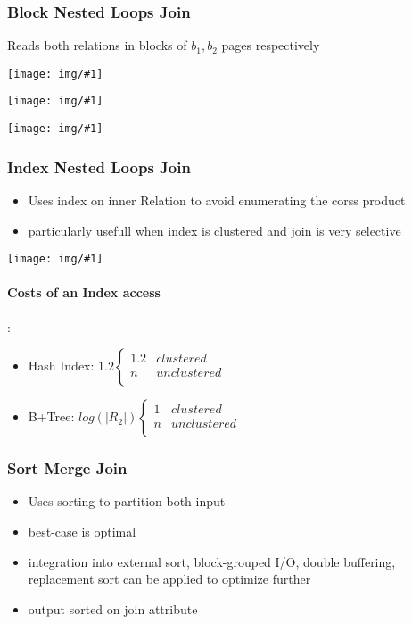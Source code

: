 \documentclass[a4paper]{article}
\newcommand{\img}[1]{\begin{center}
    \texttt{[image: img/\#1]}
\end{center} }
\begin{document}
\begin{twocolumn}
\subsubsection{Block Nested Loops Join}
 Reads both relations in blocks of $b_1, b_2$ pages respectively
\img{bnlj_basic}
\img{bnlj_hash_g}
\img{bnlj_hash}

\subsubsection{Index Nested Loops Join}
\begin{itemize}
	\item Uses index on inner Relation to avoid enumerating the corss product
	\item particularly usefull when index is clustered and join is very selective
\end{itemize}
\img{inl_algo}

\paragraph{Costs of an Index access}: \\
\begin{itemize}
	\item Hash Index: $1.2 \begin{cases} 
	1.2 & clustered \\
	n & unclustered \\
	\end{cases}$
	\item B+Tree:  $log(|R_2|) \begin{cases} 
	1 & clustered \\
	n & unclustered \\
	\end{cases}$
\end{itemize}

\subsubsection{Sort Merge Join}
\begin{itemize}
	\item Uses sorting to partition both input
	\item best-case is optimal
	\item integration into external sort, block-grouped I/O, double buffering, replacement sort can be applied to optimize further
	\item output sorted on join attribute 
\end{itemize}


\end{twocolumn}
\end{document}
